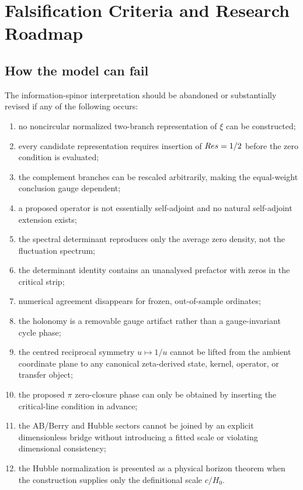 \chapter{Falsification Criteria and Research Roadmap}
\label{ch:roadmap}

\section{How the model can fail}
The information-spinor interpretation should be abandoned or substantially revised if any of the following occurs:
\begin{enumerate}
\item no noncircular normalized two-branch representation of $\xi$ can be constructed;
\item every candidate representation requires insertion of $Re s=1/2$ before the zero condition is evaluated;
\item the complement branches can be rescaled arbitrarily, making the equal-weight conclusion gauge dependent;
\item a proposed operator is not essentially self-adjoint and no natural self-adjoint extension exists;
\item the spectral determinant reproduces only the average zero density, not the fluctuation spectrum;
\item the determinant identity contains an unanalysed prefactor with zeros in the critical strip;
\item numerical agreement disappears for frozen, out-of-sample ordinates;
\item the holonomy is a removable gauge artifact rather than a gauge-invariant cycle phase;
\item the centred reciprocal symmetry $u\mapsto1/u$ cannot be lifted from the ambient coordinate plane to any canonical zeta-derived state, kernel, operator, or transfer object;
\item the proposed $\pi$ zero-closure phase can only be obtained by inserting the critical-line condition in advance;
\item the AB/Berry and Hubble sectors cannot be joined by an explicit dimensionless bridge without introducing a fitted scale or violating dimensional consistency;
\item the Hubble normalization is presented as a physical horizon theorem when the construction supplies only the definitional scale $c/H_0$.
\end{enumerate}

